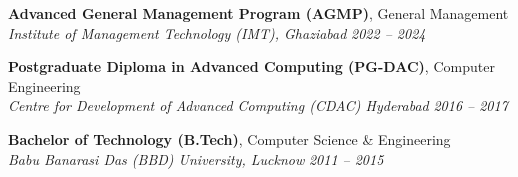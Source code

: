 \documentclass[10pt,a4paper]{article}
\begin{document}
\vspace{0.5pt}
\textbf{Advanced General Management Program (AGMP)}, General Management\\[-1pt]
\textit{Institute of Management Technology (IMT), Ghaziabad} \hfill \textit{2022 -- 2024}

\vspace{0.5pt}
\textbf{Postgraduate Diploma in Advanced Computing (PG-DAC)}, Computer Engineering\\[-1pt]
\textit{Centre for Development of Advanced Computing (CDAC) Hyderabad} \hfill \textit{2016 -- 2017}

\vspace{0.5pt}
\textbf{Bachelor of Technology (B.Tech)}, Computer Science \& Engineering\\[-1pt]
\textit{Babu Banarasi Das (BBD) University, Lucknow} \hfill \textit{2011 -- 2015}
\end{document}
